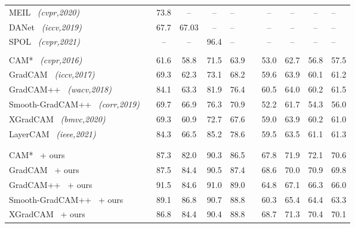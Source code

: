 \documentclass[twocolumn]{article}
\theoremstyle{definition}
\begin{document}
{\begin{table}[ht!]
{\begin{tabular}{lc*{3}{c}gc*{3}{c}g}
MEIL~\cite{Mai20CVPRmeil} {\small \emph{(cvpr,2020)}} &  &  73.8 & -- & -- & -- &  & -- & -- & -- & -- \\
DANet~\cite{XueLWJJY19iccvdanet} {\small \emph{(iccv,2019)}} &  &  67.7 & 67.03 & -- & -- &  & -- & -- & -- & -- \\
SPOL~\cite{wei2021shallowspol} {\small \emph{(cvpr,2021)}} &  &  -- & -- & 96.4 & -- &  & -- & -- & -- & -- \\
 \\
CAM*~\cite{zhou2016learning} {\small \emph{(cvpr,2016)}} &  &    61.6 & 58.8 & 71.5 & 63.9 &  & 53.0 & 62.7 & 56.8 & 57.5 \\
GradCAM~\cite{SelvarajuCDVPB17iccvgradcam} {\small \emph{(iccv,2017)}} &  &                        69.3 & 62.3 & 73.1 & 68.2 &  & 59.6 & 63.9 & 60.1 & 61.2 \\
GradCAM++~\cite{ChattopadhyaySH18wacvgradcampp} {\small \emph{(wacv,2018)}}&  &                       84.1 & 63.3 & 81.9 & 76.4 &  & 60.5 & 64.0 & 60.2 & 61.5 \\
Smooth-GradCAM++~\cite{omeiza2019corr} {\small \emph{(corr,2019)}} &  &               69.7 & 66.9 & 76.3 & 70.9 &  & 52.2 & 61.7 & 54.3 & 56.0 \\
XGradCAM~\cite{fu2020axiom} {\small \emph{(bmvc,2020)}} &  &                        69.3 & 60.9 & 72.7 & 67.6 &  & 59.0 & 63.9 & 60.2 & 61.0 \\
LayerCAM~\cite{JiangZHCW21layercam} {\small \emph{(ieee,2021)}} &  &                        84.3 & 66.5 & 85.2 & 78.6 &  & 59.5 & 63.5 & 61.1 & 61.3 \\
\\
\\
CAM*~\cite{zhou2016learning} + ours &  &                   87.3 & 82.0 & 90.3 & 86.5 &  & 67.8 & 71.9 & 72.1 & 70.6 \\
GradCAM~\cite{SelvarajuCDVPB17iccvgradcam} + ours &  &                87.5 & 84.4 & 90.5 & 87.4 &  & 68.6 & 70.0 & 70.9 & 69.8 \\
GradCAM++~\cite{zhou2016learning} + ours       &  &        91.5 & 84.6 & 91.0 & 89.0 &  & 64.8 & 67.1 & 66.3 & 66.0 \\
Smooth-GradCAM++~\cite{zhou2016learning} + ours       &  & 89.1 & 86.8 & 90.7 & 88.8 &  & 60.3 & 65.4 & 64.4 & 63.3 \\
XGradCAM~\cite{zhou2016learning} + ours       &  &         86.8 & 84.4 & 90.4 & 88.8 &  & 68.7 & 71.3 & 70.4 & 70.1 \\

\end{tabular}}
\end{table}}
\end{document}
